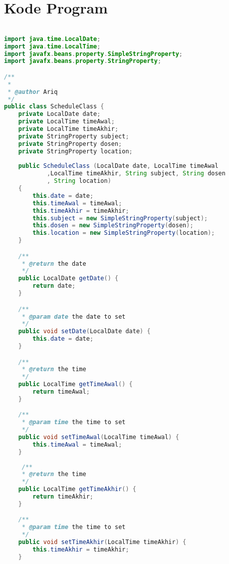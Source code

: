 \chapter{Kode Program}
\label{lamp:A}

\singlespacing 
%
%
\begin{lstlisting}[language=Java,basicstyle=\tiny,caption=ScheduleClass.java,label=lst:ScheduleClass]

import java.time.LocalDate;
import java.time.LocalTime;
import javafx.beans.property.SimpleStringProperty;
import javafx.beans.property.StringProperty;

/**
 *
 * @author Ariq
 */
public class ScheduleClass {
    private LocalDate date;
    private LocalTime timeAwal;
    private LocalTime timeAkhir;
    private StringProperty subject;
    private StringProperty dosen;
    private StringProperty location;
    
    public ScheduleClass (LocalDate date, LocalTime timeAwal
            ,LocalTime timeAkhir, String subject, String dosen
            , String location)
    {
        this.date = date;
        this.timeAwal = timeAwal;
        this.timeAkhir = timeAkhir;
        this.subject = new SimpleStringProperty(subject);
        this.dosen = new SimpleStringProperty(dosen);
        this.location = new SimpleStringProperty(location);
    }

    /**
     * @return the date
     */
    public LocalDate getDate() {
        return date;
    }

    /**
     * @param date the date to set
     */
    public void setDate(LocalDate date) {
        this.date = date;
    }

    /**
     * @return the time
     */
    public LocalTime getTimeAwal() {
        return timeAwal;
    }

    /**
     * @param time the time to set
     */
    public void setTimeAwal(LocalTime timeAwal) {
        this.timeAwal = timeAwal;
    }
    
     /**
     * @return the time
     */
    public LocalTime getTimeAkhir() {
        return timeAkhir;
    }

    /**
     * @param time the time to set
     */
    public void setTimeAkhir(LocalTime timeAkhir) {
        this.timeAkhir = timeAkhir;
    }


\end{lstlisting}
